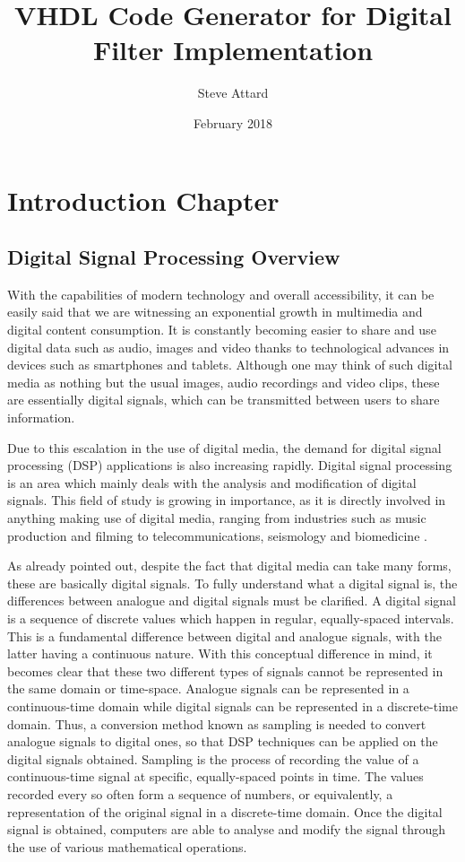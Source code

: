 \documentclass{csfyp}
\title{VHDL Code Generator for Digital Filter Implementation}
\author{Steve Attard}
\date{February 2018}
\begin{document}

\newpage

\setcounter{page}{1}


\section{Introduction Chapter}
\label{s:intro}
\subsection{Digital Signal Processing Overview}
With the capabilities of modern technology and overall accessibility, it can be easily said that we are witnessing an exponential growth in multimedia and digital content consumption. It is constantly becoming easier to share and use digital data such as audio, images and video thanks to technological advances in devices such as smartphones and tablets. Although one may think of such digital media as nothing but the usual images, audio recordings and video clips, these are essentially digital signals, which can be transmitted between users to share information.

Due to this escalation in the use of digital media, the demand for digital signal processing (DSP) applications is also increasing rapidly. Digital signal processing is an area which mainly deals with the analysis and modification of digital signals. This field of study is growing in importance, as it is directly involved in anything making use of digital media, ranging from industries such as music production and filming to telecommunications, seismology and biomedicine \cite{tsao2012area} \cite{tekalp2015digital} \cite{gholam1998ecg}.

As already pointed out, despite the fact that digital media can take many forms, these are basically digital signals. To fully understand what a digital signal is, the differences between analogue and digital signals must be clarified. A digital signal is a sequence of discrete values which happen in regular, equally-spaced intervals. This is a fundamental difference between digital and analogue signals, with the latter having a continuous nature. With this conceptual difference in mind, it becomes clear that these two different types of signals cannot be represented in the same domain or time-space. Analogue signals can be represented in a continuous-time domain while digital signals can be represented in a discrete-time domain. Thus, a conversion method known as sampling is needed to convert analogue signals to digital ones, so that DSP techniques can be applied on the digital signals obtained. Sampling is the process of recording the value of a continuous-time signal at specific, equally-spaced points in time. The values recorded every so often form a sequence of numbers, or equivalently, a representation of the original signal in a discrete-time domain. Once the digital signal is obtained, computers are able to analyse and modify the signal through the use of various mathematical operations.
\end{document}
